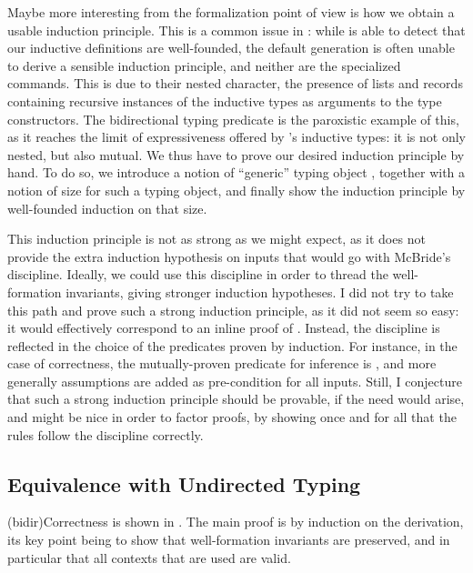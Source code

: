 Maybe more interesting from the formalization point of view is how we obtain a usable
induction principle. This is a common issue in : while
 is able to detect that our inductive definitions are well-founded,
the default generation is often unable to derive a sensible induction principle,
and neither are the  specialized commands. This is due to their nested
character, \ie the presence of lists and records containing recursive instances
of the inductive types as arguments to the type constructors.
The bidirectional typing predicate is the paroxistic example of this, as it
reaches the limit of expressiveness offered by
’s inductive types: it is not only nested, but also mutual.
We thus have to prove our desired induction principle by
hand. To do so, we introduce a notion of “generic” typing object
,
together with a notion of size for such a typing object,
and finally show the induction principle
by well-founded induction on that size.

This induction principle is not as strong as we might expect, as it does not provide the extra induction hypothesis on inputs that would go with McBride's discipline.
Ideally, we could use this discipline
in order to thread the well-formation invariants, giving stronger induction
hypotheses. I did not try to take this path and prove such a strong induction principle,
as it did not seem so easy: it would effectively correspond to an inline proof
of .
Instead, the discipline is reflected in the choice of the predicates proven by induction.
For instance, in the case of correctness, the mutually-proven predicate for inference
is , and more generally
assumptions are added as pre-condition for all inputs.
Still, I conjecture that such a strong induction principle should be provable, if the need
would arise, and might be nice in order to factor proofs, by showing once and for all that
the rules follow the discipline correctly.

\subsection{Equivalence with Undirected Typing}

\kl(bidir){Correctness}%
is shown in .
The main proof is by induction on the derivation,
its key point being to show that well-formation invariants are preserved, and in particular
that all contexts that are used are valid.

